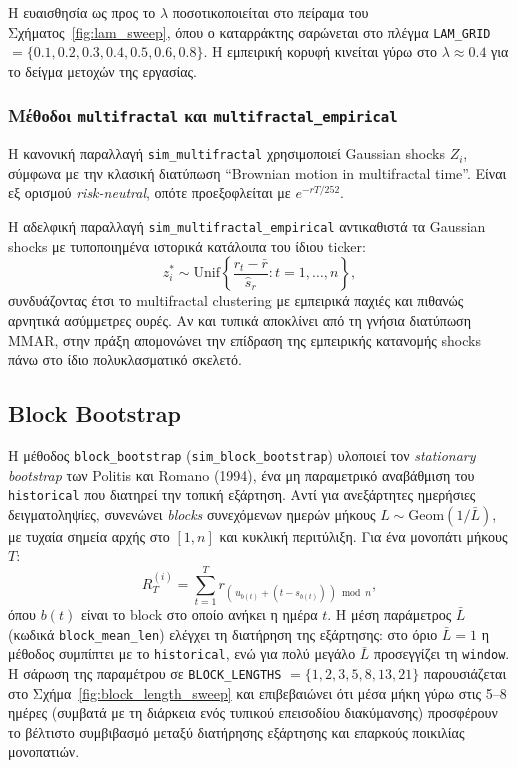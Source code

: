 \documentclass[12pt]{article}
\begin{document}
Η ευαισθησία ως προς το $\lambda$ ποσοτικοποιείται στο πείραμα του Σχήματος~\ref{fig:lam_sweep}, όπου ο καταρράκτης σαρώνεται στο πλέγμα \texttt{LAM\_GRID} $= \{0.1, 0.2, 0.3, 0.4, 0.5, 0.6, 0.8\}$. Η εμπειρική κορυφή κινείται γύρω στο $\lambda \approx 0.4$ για το δείγμα μετοχών της εργασίας.

\subsubsection{Μέθοδοι \texttt{multifractal} και \texttt{multifractal\_empirical}}
Η κανονική παραλλαγή \texttt{sim\_multifractal} χρησιμοποιεί Gaussian shocks $Z_i$, σύμφωνα με την κλασική διατύπωση ``Brownian motion in multifractal time''. Είναι εξ ορισμού \emph{risk-neutral}, οπότε προεξοφλείται με $e^{-rT/252}$.

Η αδελφική παραλλαγή \texttt{sim\_multifractal\_empirical} αντικαθιστά τα Gaussian shocks με τυποποιημένα ιστορικά κατάλοιπα του ίδιου ticker:
\[
  z^{*}_i \sim \mathrm{Unif}\!\left\{ \frac{r_t - \bar r}{\hat s_r} : t=1,\dots,n \right\},
\]
συνδυάζοντας έτσι το multifractal clustering με εμπειρικά παχιές και πιθανώς αρνητικά ασύμμετρες ουρές. Αν και τυπικά αποκλίνει από τη γνήσια διατύπωση MMAR, στην πράξη απομονώνει την επίδραση της εμπειρικής κατανομής shocks πάνω στο ίδιο πολυκλασματικό σκελετό.

\subsection{Block Bootstrap}
\label{sec:block_bootstrap}
Η μέθοδος \texttt{block\_bootstrap} (\texttt{sim\_block\_bootstrap}) υλοποιεί τον \emph{stationary bootstrap} των Politis και Romano (1994), ένα μη παραμετρικό αναβάθμιση του \texttt{historical} που διατηρεί την τοπική εξάρτηση. Αντί για ανεξάρτητες ημερήσιες δειγματοληψίες, συνενώνει \emph{blocks} συνεχόμενων ημερών μήκους $L \sim \mathrm{Geom}(1/\bar L)$, με τυχαία σημεία αρχής στο $[1, n]$ και κυκλική περιτύλιξη. Για ένα μονοπάτι μήκους $T$:
\[
  R_T^{(i)} = \sum_{t=1}^{T} r_{(\,u_{b(t)} + (t - s_{b(t)})\,) \bmod n},
\]
όπου $b(t)$ είναι το block στο οποίο ανήκει η ημέρα $t$. Η μέση παράμετρος $\bar L$ (κωδικά \texttt{block\_mean\_len}) ελέγχει τη διατήρηση της εξάρτησης: στο όριο $\bar L = 1$ η μέθοδος συμπίπτει με το \texttt{historical}, ενώ για πολύ μεγάλο $\bar L$ προσεγγίζει τη \texttt{window}. Η σάρωση της παραμέτρου σε \texttt{BLOCK\_LENGTHS} $= \{1, 2, 3, 5, 8, 13, 21\}$ παρουσιάζεται στο Σχήμα~\ref{fig:block_length_sweep} και επιβεβαιώνει ότι μέσα μήκη γύρω στις 5--8 ημέρες (συμβατά με τη διάρκεια ενός τυπικού επεισοδίου διακύμανσης) προσφέρουν το βέλτιστο συμβιβασμό μεταξύ διατήρησης εξάρτησης και επαρκούς ποικιλίας μονοπατιών.
\end{document}
